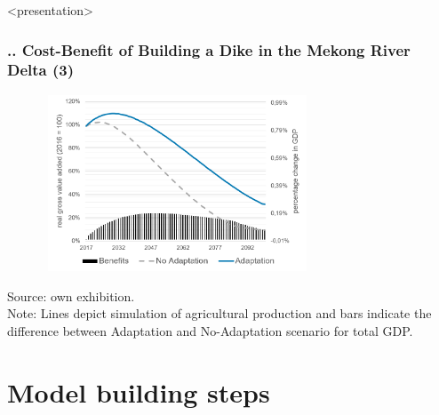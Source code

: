\documentclass[11pt,aspectratio=169]{beamer}
\begin{document}
\begin{frame}<presentation>
	\frametitle{{\thesection.\thesubsection.\thesubsubsection} Cost-Benefit of Building a Dike in the Mekong River Delta (3)}
	\begin{figure}
	\includegraphics[width=8cm,height=5.25cm]{pictures/Cost_Benefit_Analysis_Dike}
	\end{figure}
	{\footnotesize Source: own exhibition.} \\
	{\footnotesize Note: Lines depict simulation of agricultural production and bars indicate the difference between Adaptation and No-Adaptation scenario for total GDP.}
	
\end{frame}



\section{Model building steps}
\end{document}
